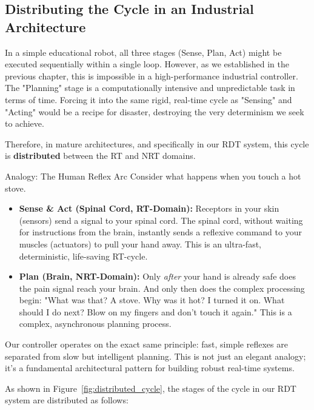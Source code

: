 \subsection{Distributing the Cycle in an Industrial Architecture}
\label{subsec:distributing_the_cycle}

In a simple educational robot, all three stages (Sense, Plan, Act) might be executed sequentially within a single loop. However, as we established in the previous chapter, this is impossible in a high-performance industrial controller. The "Planning" stage is a computationally intensive and unpredictable task in terms of time. Forcing it into the same rigid, real-time cycle as "Sensing" and "Acting" would be a recipe for disaster, destroying the very determinism we seek to achieve.

Therefore, in mature architectures, and specifically in our RDT system, this cycle is \textbf{distributed} between the RT and NRT domains.

\begin{tipbox}{Analogy: The Human Reflex Arc}
    Consider what happens when you touch a hot stove.
    \begin{itemize}
        \item \textbf{Sense \& Act (Spinal Cord, RT-Domain):} Receptors in your skin (sensors) send a signal to your spinal cord. The spinal cord, without waiting for instructions from the brain, instantly sends a reflexive command to your muscles (actuators) to pull your hand away. This is an ultra-fast, deterministic, life-saving RT-cycle.
        \item \textbf{Plan (Brain, NRT-Domain):} Only \textit{after} your hand is already safe does the pain signal reach your brain. And only then does the complex processing begin: "What was that? A stove. Why was it hot? I turned it on. What should I do next? Blow on my fingers and don't touch it again." This is a complex, asynchronous planning process.
    \end{itemize}
    Our controller operates on the exact same principle: fast, simple reflexes are separated from slow but intelligent planning. This is not just an elegant analogy; it's a fundamental architectural pattern for building robust real-time systems.
\end{tipbox}

As shown in Figure~\ref{fig:distributed_cycle}, the stages of the cycle in our RDT system are distributed as follows:


